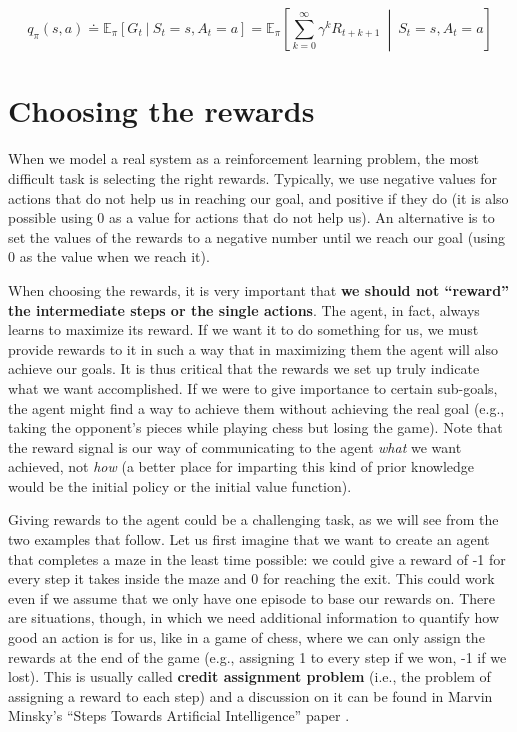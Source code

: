 \begin{equation}
    q_\pi(s,a) \doteq \mathbb{E}_\pi \left[ G_t \  \vert \  S_t = s, A_t = a \right] = \mathbb{E}_\pi \left[ \sum_{k=0}^{\infty} \gamma^k R_{t+k+1} \  \middle\vert \ S_t = s, A_t = a \right]
    \label{eq:ch2-actionvaluefunction}
\end{equation}

\section{Choosing the rewards}
When we model a real system as a reinforcement learning problem, the most difficult task is selecting the right rewards. Typically, we use negative values for actions that do not help us in reaching our goal, and positive if they do (it is also possible using 0 as a value for actions that do not help us). An alternative is to set the values of the rewards to a negative number until we reach our goal (using 0 as the value when we reach it).

When choosing the rewards, it is very important that \textbf{we should not ``reward'' the intermediate steps or the single actions}. The agent, in fact, always learns to maximize its reward. If we want it to do something for us, we must provide rewards to it in such a way that in maximizing them the agent will also achieve our goals. It is thus critical that the rewards we set up truly indicate what we want accomplished. If we were to give importance to certain sub-goals, the agent might find a way to achieve them without achieving the real goal (e.g., taking the opponent's pieces while playing chess but losing the game). Note that the reward signal is our way of communicating to the agent \textit{what} we want achieved, not \textit{how} (a better place for imparting this kind of prior knowledge would be the initial policy or the initial value function).

Giving rewards to the agent could be a challenging task, as we will see from the two examples that follow. Let us first imagine that we want to create an agent that completes a maze in the least time possible: we could give a reward of -1 for every step it takes inside the maze and 0 for reaching the exit. This could work even if we assume that we only have one episode to base our rewards on. There are situations, though, in which we need additional information to quantify how good an action is for us, like in a game of chess, where we can only assign the rewards at the end of the game (e.g., assigning 1 to every step if we won, -1 if we lost). This is usually called \textbf{credit assignment problem} (i.e., the problem of assigning a reward to each step) and a discussion on it can be found in Marvin Minsky’s ``Steps Towards Artificial Intelligence'' paper \cite{4066245}.

